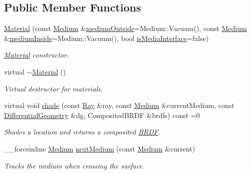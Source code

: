 \subsection*{Public Member Functions}
\begin{DoxyCompactItemize}
\item 
\hyperlink{classembree_1_1_material_ac39480b8bb420977c387e07765b27dc0}{Material} (const \hyperlink{classembree_1_1_medium}{Medium} \&\hyperlink{classembree_1_1_material_af5c721cdded6b10003304fbc781f479b}{mediumOutside}=Medium::Vacuum(), const \hyperlink{classembree_1_1_medium}{Medium} \&\hyperlink{classembree_1_1_material_a02b33b77edd5fe04ce258e0eb72f175d}{mediumInside}=Medium::Vacuum(), bool \hyperlink{classembree_1_1_material_a6158f547322780ca4aff8af0c9d00f6a}{isMediaInterface}=false)
\begin{DoxyCompactList}\small\item\em \hyperlink{classembree_1_1_material}{Material} constructor. \item\end{DoxyCompactList}\item 
\hypertarget{classembree_1_1_material_ac69794ac4ea4e2207b27671f4b7bedcc}{
virtual \hyperlink{classembree_1_1_material_ac69794ac4ea4e2207b27671f4b7bedcc}{$\sim$Material} ()}
\label{classembree_1_1_material_ac69794ac4ea4e2207b27671f4b7bedcc}

\begin{DoxyCompactList}\small\item\em Virtual destructor for materials. \item\end{DoxyCompactList}\item 
virtual void \hyperlink{classembree_1_1_material_a371ca178d6cc226c3d6c758cb41f8cef}{shade} (const \hyperlink{structembree_1_1_ray}{Ray} \&ray, const \hyperlink{classembree_1_1_medium}{Medium} \&currentMedium, const \hyperlink{structembree_1_1_differential_geometry}{DifferentialGeometry} \&dg, CompositedBRDF \&brdfs) const =0
\begin{DoxyCompactList}\small\item\em Shades a location and returns a composited \hyperlink{classembree_1_1_b_r_d_f}{BRDF}. \item\end{DoxyCompactList}\item 
\_\-\_\-forceinline \hyperlink{classembree_1_1_medium}{Medium} \hyperlink{classembree_1_1_material_a325ad6d182d3bc3f8fa209f624bb0074}{nextMedium} (const \hyperlink{classembree_1_1_medium}{Medium} \&current)
\begin{DoxyCompactList}\small\item\em Tracks the medium when crossing the surface. \item\end{DoxyCompactList}\end{DoxyCompactItemize}
